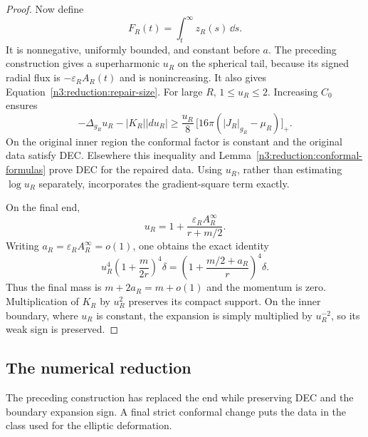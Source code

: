 \begin{proof}
Now define
\[
 F_R(t)=\int_t^\infty z_R(s)\,\dd s.
\]
It is nonnegative, uniformly bounded, and constant before $a$.
The preceding construction gives a superharmonic $u_R$ on the spherical
tail, because its signed radial flux is
$-\varepsilon_RA_R(t)$ and is nonincreasing.  It also gives
Equation~\eqref{n3:reduction:repair-size}.  For large $R$, $1\le u_R\le2$.
Increasing $C_0$ ensures
\[
 -\Delta_{g_R}u_R-|K_R||du_R|
 \ge \frac{u_R}{8}\,
       \bigl[16\pi(|J_R|_{g_R}-\mu_R)\bigr]_+.
\]
On the original inner region the conformal factor is constant and the
original data satisfy DEC.  Elsewhere this inequality and
Lemma~\ref{n3:reduction:conformal-formulas} prove DEC for the repaired data.
Using $u_R$, rather than estimating $\log u_R$ separately, incorporates
the gradient-square term exactly.

On the final end,
\[
 u_R=1+\frac{\varepsilon_RA_R^\infty}{r+m/2}.
\]
Writing $a_R=\varepsilon_RA_R^\infty=o(1)$, one obtains the exact identity
\begin{equation}
 \label{n3:reduction:repaired-schwarzschild}
 u_R^4\left(1+\frac{m}{2r}\right)^4\delta
   =\left(1+\frac{m/2+a_R}{r}\right)^4\delta.
\end{equation}
Thus the final mass is $m+2a_R=m+o(1)$ and the momentum is zero.
Multiplication of $K_R$ by $u_R^2$ preserves its compact support.
On the inner boundary, where $u_R$ is constant, the expansion is simply
multiplied by $u_R^{-2}$, so its weak sign is preserved.
\end{proof}

\subsection{The numerical reduction}

The preceding construction has replaced the end while preserving DEC
and the boundary expansion sign.  A final strict conformal change puts
the data in the class used for the elliptic deformation.


